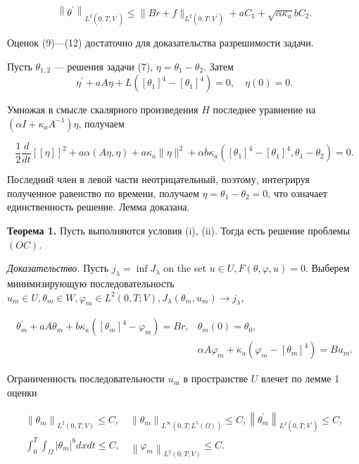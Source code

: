\[
\left\|\theta^{\prime}\right\|_{L^{2}\left(0, T; V^{\prime}\right)}
\leq\|B r+f\|_{L^{2}\left(0, T ; V^{\prime}\right)}+a C_{1}+\sqrt{\alpha \kappa_{a}} b C_{2}.
\]


Оценок (9)—(12) достаточно для доказательства разрешимости задачи.

Пусть $\theta_{1,2}$ — решения задачи (7), $\eta=\theta_{1}-\theta_{2}$.
Затем
\[
\eta^{\prime}+a A \eta+L\left(\left[\theta_{1}\right]^{4}-
\left[\theta_{1}\right]^{4}\right)=0, \quad \eta(0)=0.
\]


Умножая в смысле скалярного произведения $H$ последнее уравнение на
$\left(\alpha I+\kappa_{a} A^{-1}\right) \eta$, получаем

\[
\frac{1}{2} \frac{d}{d t}[[\eta]]^{2}+a \alpha(A \eta, \eta)
+a \kappa_{a}\|\eta\|^{2}+\alpha b \kappa_{a}\left(\left[\theta_{1}\right]^{4}
-\left[\theta_{1}\right]^{4}, \theta_{1}-\theta_{2}\right)=0.
\]


Последний член в левой части неотрицательный, поэтому, интегрируя полученное равенство по времени,
получаем $\eta=\theta_{1}-\theta_{2}=0$, что означает единственность решение.
Лемма доказана.

\textbf{Теорема 1.}
Пусть выполняются условия (i), (ii).
Тогда есть решение проблемы $(OC)$.

\textit{Доказательство.}
Пусть $j_{\lambda}=\inf J_{\lambda}$ on the set $u \in U, F(\theta, \varphi, u)=0$.
Выберем минимизирующую последовательность
$u_{m} \in U, \theta_{m} \in W, \varphi_{m} \in L^{2}(0, T; V),
J_{\lambda}\left(\theta_{m}, u_{m}\right) \rightarrow j_{\lambda}$,

\[
\begin{aligned}
\theta_{m}^{\prime}+a A \theta_{m}+b \kappa_{a}\left(\left[\theta_{m}\right]^{4}-
\varphi_{m}\right)=B r, & \theta_{m}(0)=\theta_{0}, \\
& \alpha A \varphi_{m}+\kappa_{a}\left(\varphi_{m}-
\left[\theta_{m}\right]^{4}\right)=B u_{m}.
\end{aligned}
\]

Ограниченность последовательности $u_{m}$ в пространстве $U$ влечет по лемме 1 оценки

\[
\begin{gathered}
\left\|\theta_{m}\right\|_{L^{2}(0, T ; V)} \leq C,
\quad\left\|\theta_{m}\right\|_{L^{\infty}\left(0, T; L^{5}(\Omega)\right)} \leq C,
\left\|\theta_{m}^{\prime}\right\|_{L^{2}\left(0, T; V^{\prime}\right)} \leq C, \\
\int_{0}^{T} \int_{\Omega}\left|\theta_{m}\right|^{8} d x d t \leq C,
\quad\left\|\varphi_{m}\right\|_{L^{2}(0, T ; V)} \leq C.
\end{gathered}
\]

